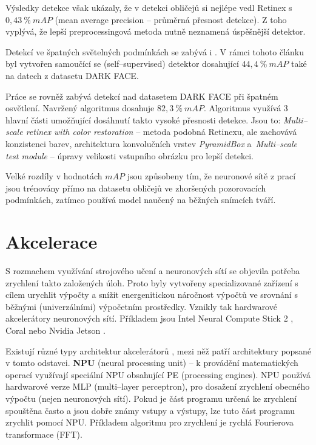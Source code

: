 Výsledky detekce však ukázaly, že v detekci obličejů si nejlépe vedl Retinex s $0,43\:\%\:mAP$ (mean average precision -- průměrná přesnost detekce). Z toho vyplývá, že lepší preprocessingová metoda nutně neznamená úspěšnější detektor.

Detekcí ve špatných světelných podmínkách se zabývá i \cite{HLAFace}. V rámci tohoto článku byl vytvořen samoučící se (self--supervised) detektor dosahující $44,4\:\%\:mAP$ také na datech z datasetu DARK FACE.

Práce \cite{fdExtremelyLowConditions} se rovněž zabývá detekcí nad datasetem DARK FACE při špatném osvětlení. Navržený algoritmus dosahuje $82,3\:\%\:mAP$. Algoritmus využívá 3 hlavní části umožňující dosáhnutí takto vysoké přesnosti detekce. Jsou to: \emph{Multi--scale retinex with color restoration} -- metoda podobná Retinexu, ale zachovává konzistenci barev, architektura konvolučních vrstev \emph{PyramidBox} a~\emph{Multi--scale test module} -- úpravy velikosti vstupního obrázku pro lepší detekci.

Velké rozdíly v hodnotách $mAP$ jsou způsobeny tím, že neuronové sítě z prací \cite{HLAFace, fdExtremelyLowConditions} jsou trénovány přímo na datasetu obličejů ve zhoršených pozorovacích podmínkách, zatímco \cite{lowLightFdReview} používá model naučený na běžných snímcích tváří.


\section{Akcelerace}
\label{sekce:akcelerace}

S rozmachem využívání strojového učení a neuronových sítí se objevila potřeba zrychlení takto založených úloh. Proto byly vytvořeny specializované zařízení s cílem urychlit výpočty a snížit energenitickou náročnost výpočtů ve srovnání s běžnými (univerzálními) výpočetním prostředky. Vznikly tak hardwarové akcelerátory neuronových sítí. Příkladem jsou Intel Neural Compute Stick 2 \cite{ncs2}, Coral \cite{coral} nebo Nvidia Jetson \cite{jetson}.

Existují různé typy architektur akcelerátorů \cite{acceleratorsSurvey}, mezi něž patří architektury popsané v tomto odstavci.
\textbf{NPU} (neural processing unit) -- k provádění matematických operací využívají speciální NPU obsahující PE (processing engines). NPU používá hardwarové verze MLP (multi--layer perceptron), pro dosažení zrychlení obecného výpočtu (nejen neuronových sítí). Pokud je část programu určená ke zrychlení spouštěna často a jsou dobře známy vstupy a výstupy, lze tuto část programu zrychlit pomocí NPU. Příkladem algoritmu pro zrychlení je rychlá Fourierova transformace (FFT).

